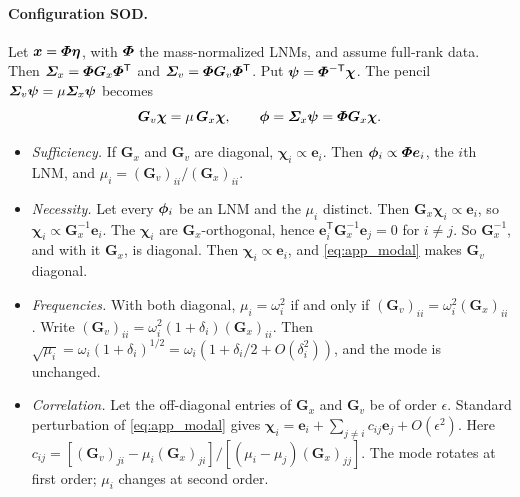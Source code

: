 \documentclass[preprint,12pt]{elsarticle}
\begin{document}
\paragraph{Configuration SOD.} Let $\bm{x}=\bm{\varPhi}\bm{\eta}$, with $\bm{\varPhi}$ the mass-normalized LNMs, and assume full-rank data. Then $\bm{\varSigma}_x=\bm{\varPhi}\bm{G}_x\bm{\varPhi}^{\mathsf T}$ and $\bm{\varSigma}_v=\bm{\varPhi}\bm{G}_v\bm{\varPhi}^{\mathsf T}$. Put $\bm{\psi}=\bm{\varPhi}^{-\mathsf T}\bm{\chi}$. The pencil $\bm{\varSigma}_v\bm{\psi}=\mu\bm{\varSigma}_x\bm{\psi}$ becomes
\begin{equation}
\bm{G}_v\bm{\chi}=\mu\,\bm{G}_x\bm{\chi},\qquad \bm{\phi}=\bm{\varSigma}_x\bm{\psi}=\bm{\varPhi}\bm{G}_x\bm{\chi} .
\label{eq:app_modal}
\end{equation}
\begin{itemize}
\item \emph{Sufficiency.} If $\bm{G}_x$ and $\bm{G}_v$ are diagonal, $\bm{\chi}_i\propto\bm{e}_i$. Then $\bm{\phi}_i\propto\bm{\varPhi}\bm{e}_i$, the $i$th LNM, and $\mu_i=(\bm{G}_v)_{ii}/(\bm{G}_x)_{ii}$.
\item \emph{Necessity.} Let every $\bm{\phi}_i$ be an LNM and the $\mu_i$ distinct. Then $\bm{G}_x\bm{\chi}_i\propto\bm{e}_i$, so $\bm{\chi}_i\propto\bm{G}_x^{-1}\bm{e}_i$. The $\bm{\chi}_i$ are $\bm{G}_x$-orthogonal, hence $\bm{e}_i^{\mathsf T}\bm{G}_x^{-1}\bm{e}_j=0$ for $i\ne j$. So $\bm{G}_x^{-1}$, and with it $\bm{G}_x$, is diagonal. Then $\bm{\chi}_i\propto\bm{e}_i$, and \eqref{eq:app_modal} makes $\bm{G}_v$ diagonal.
\item \emph{Frequencies.} With both diagonal, $\mu_i=\omega_i^2$ if and only if $(\bm{G}_v)_{ii}=\omega_i^2(\bm{G}_x)_{ii}$. Write $(\bm{G}_v)_{ii}=\omega_i^2(1+\delta_i)(\bm{G}_x)_{ii}$. Then $\sqrt{\mu_i}=\omega_i(1+\delta_i)^{1/2}=\omega_i(1+\delta_i/2+O(\delta_i^2))$, and the mode is unchanged.
\item \emph{Correlation.} Let the off-diagonal entries of $\bm{G}_x$ and $\bm{G}_v$ be of order $\epsilon$. Standard perturbation of \eqref{eq:app_modal} gives $\bm{\chi}_i=\bm{e}_i+\sum_{j\ne i}c_{ij}\bm{e}_j+O(\epsilon^2)$. Here $c_{ij}=[(\bm{G}_v)_{ji}-\mu_i(\bm{G}_x)_{ji}]/[(\mu_i-\mu_j)(\bm{G}_x)_{jj}]$. The mode rotates at first order; $\mu_i$ changes at second order.
\end{itemize}
\end{document}
